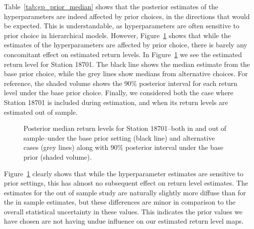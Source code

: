 \documentclass[11pt,english]{article}
\begin{document}
Table~\ref{tab:gp_prior_median} shows that the posterior estimates of the hyperparameters are indeed affected by prior choices, in the directions that would be expected.  This is understandable, as hyperparameters are often sensitive to prior choice in hierarchical models.  However, Figure~\ref{fig:prior_sensitivity} shows that while the estimates of the hyperparameters are affected by prior choice, there is barely any concomitant effect on estimated return levels.  In Figure~\ref{fig:prior_sensitivity} we see the estimated return level for Station 18701. The black line shows the median estimate from the base prior choice, while the grey lines show medians from alternative choices.  For reference, the shaded volume shows the 90\% posterior interval for each return level under the base prior choice.  Finally, we considered both the case where Station 18701 is included during estimation, and when its return levels are estimated out of sample.

\begin{figure}
\begin{center}
\caption{Posterior median return levels for Station 18701--both in and out of sample--under the base prior setting (black line) and alternative cases (grey lines) along with 90\% posterior interval under the base prior (shaded volume).}\label{fig:prior_sensitivity}
\end{center}
\end{figure}

Figure~\ref{fig:prior_sensitivity} clearly shows that while the hyperparameter estimates are sensitive to prior settings, this has almost no subsequent effect on return level estimates.  The estimates for the out of sample study are naturally slightly more diffuse than for the in sample estimates, but these differences are minor in comparison to the overall statistical uncertainty in these values.  This indicates the prior values we have chosen are not having undue influence on our estimated return level maps.
\end{document}
